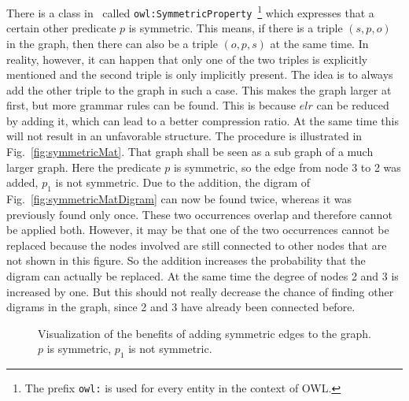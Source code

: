 
There is a class in~\cite{owl} called {\tt owl:SymmetricProperty}~\footnote{The prefix {\tt owl:} is used for every entity in the context of OWL.} which expresses that a certain other predicate $p$ is symmetric. This means, if there is a triple $(s,p,o)$ in the graph, then there can also be a triple $(o,p,s)$ at the same time. In reality, however, it can happen that only one of the two triples is explicitly mentioned and the second triple is only implicitly present. The idea is to always add the other triple to the graph in such a case. This makes the graph larger at first, but more grammar rules can be found. This is because $elr$ can be reduced by adding it, which can lead to a better compression ratio. At the same time this will not result in an unfavorable structure. The procedure is illustrated in Fig.~\ref{fig:symmetricMat}. That graph shall be seen as a sub graph of a much larger graph. Here the predicate $p$ is symmetric, so the edge from node 3 to 2 was added, $p_1$ is not symmetric. Due to the addition, the digram of Fig.~\ref{fig:symmetricMatDigram} can now be found twice, whereas it was previously found only once. These two occurrences overlap and therefore cannot be applied both. However, it may be that one of the two occurrences cannot be replaced because the nodes involved are still connected to other nodes that are not shown in this figure. So the addition increases the probability that the digram can actually be replaced. At the same time the degree of nodes 2 and 3 is increased by one. But this should not really decrease the chance of finding other digrams in the graph, since 2 and 3 have already been connected before.


\begin{figure}[h]
	\centering
	\hfill
	\caption{Visualization of the benefits of adding symmetric edges to the graph. $p$ is symmetric, $p_1$ is not symmetric.}
	\label{}
\end{figure}


